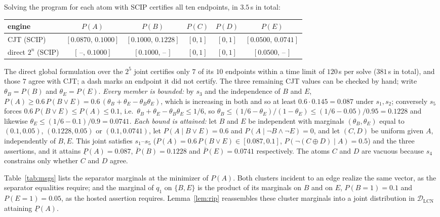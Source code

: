 \documentclass{article} %
\newcommand{\lo}{\underline}
\newcommand{\hi}{\overline}
\newcommand{\DLCN}{\mathcal{D}_{\mathrm{LCN}}}
\begin{document}
Solving the program for each atom with SCIP certifies all ten endpoints, in
$3.5$\,s in total:
\begin{center}\small
\begin{tabular}{@{}lccccc@{}}
\toprule
engine & $P(A)$ & $P(B)$ & $P(C)$ & $P(D)$ & $P(E)$ \\
\midrule
\textsc{CJT} (SCIP) & $[0.0870,\,0.1000]$ & $[0.1000,\,0.1228]$ & $[0,1]$ & $[0,1]$ & $[0.0500,\,0.0741]$ \\
direct $2^n$ (SCIP) & $[\,\text{--},\,0.1000]$ & $[0.1000,\,\text{--}\,]$ & $[0,1]$ & $[0,1]$ & $[0.0500,\,\text{--}\,]$ \\
\bottomrule
\end{tabular}
\end{center}
The direct global formulation over the $2^5$ joint certifies only $7$ of its $10$
endpoints within a time limit of $120$\,s per solve ($381$\,s in total), and
those $7$ agree with \textsc{CJT}; a dash marks an endpoint it did not certify.
The three remaining \textsc{CJT} values can be checked by hand; write
$\theta_B=P(B)$ and $\theta_E=P(E)$. \emph{Every member is bounded:} by $s_3$ and
the independence of $B$ and $E$,
$P(A)\ge0.6\,P(B\vee E)=0.6\,(\theta_B+\theta_E-\theta_B\theta_E)$, which is
increasing in both and so at least $0.6\cdot0.145=0.087$ under $s_1,s_2$;
conversely $s_5$ forces $0.6\,P(B\vee E)\le P(A)\le0.1$, i.e.\
$\theta_B+\theta_E-\theta_B\theta_E\le1/6$, so
$\theta_B\le(1/6-\theta_E)/(1-\theta_E)\le(1/6-0.05)/0.95=0.1228$ and likewise
$\theta_E\le(1/6-0.1)/0.9=0.0741$. \emph{Each bound is attained:} let $B$ and $E$ be
independent with marginals $(\theta_B,\theta_E)$ equal to $(0.1,0.05)$,
$(0.1228,0.05)$ or $(0.1,0.0741)$, let $P(A\mid B\vee E)=0.6$ and
$P(A\mid\lnot B\wedge\lnot E)=0$, and let $(C,D)$ be uniform given $A$,
independently of $B,E$. This joint satisfies $s_1$--$s_5$ ($P(A)=0.6\,P(B\vee
E)\in[0.087,0.1]$, $P(\lnot(C\oplus D)\mid A)=0.5$) and the three assertions, and
it attains $\lo P(A)=0.087$, $\hi P(B)=0.1228$ and $\hi P(E)=0.0741$
respectively. The atoms $C$ and $D$ are vacuous because $s_4$ constrains only
whether $C$ and $D$ agree.

Table~\ref{tab:msgs} lists the separator marginals at the minimizer of $P(A)$.
Both clusters incident to an edge realize the same vector, as the separator
equalities require; and the marginal of $q_1$ on $\{B,E\}$ is the product of its
marginals on $B$ and on $E$, $P(B{=}1)=0.1$ and $P(E{=}1)=0.05$, as the hosted
assertion requires. Lemma~\ref{lem:rip} reassembles these cluster marginals into a
joint distribution in $\DLCN$ attaining $\lo P(A)$.
\end{document}
